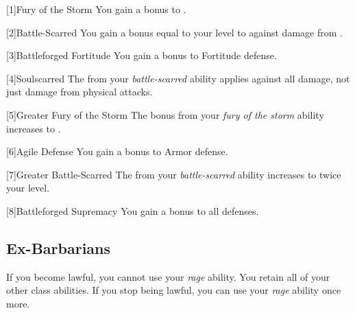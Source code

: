         [1]{Fury of the Storm} You gain a  bonus to .

        [2]{Battle-Scarred} You gain a bonus equal to your level to  against damage from .

        [3]{Battleforged Fortitude} You gain a  bonus to Fortitude defense.

        [4]{Soulscarred} The  from your \textit{battle-scarred} ability applies against all damage, not just damage from physical attacks.

        [5]{Greater Fury of the Storm}
        The bonus from your \textit{fury of the storm} ability increases to .

        [6]{Agile Defense}
        You gain a  bonus to Armor defense.

        [7]{Greater Battle-Scarred}
        The  from your \textit{battle-scarred} ability increases to twice your level.

        [8]{Battleforged Supremacy}
        You gain a  bonus to all defenses.

    \subsection{Ex-Barbarians}
        If you become lawful, you cannot use your \textit{rage} ability.
        You retain all of your other class abilities.
        If you stop being lawful, you can use your \textit{rage} ability once more.

\newpage
